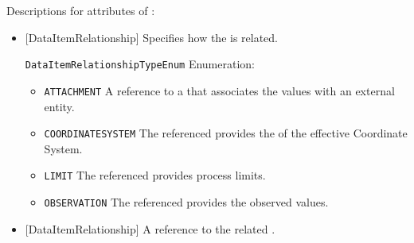 Descriptions for attributes of :

\begin{itemize}

\item {}[DataItemRelationship] \newline Specifies how the  is related.

\texttt{DataItemRelationshipTypeEnum} Enumeration:

\begin{itemize}
\item \texttt{ATTACHMENT} \newline A reference to a  that associates the values with an external entity.
 
\item \texttt{COORDINATE\textunderscore SYSTEM} \newline  The referenced  provides the  of the effective Coordinate System.
 
\item \texttt{LIMIT} \newline The referenced  provides process limits.
 
\item \texttt{OBSERVATION} \newline The referenced  provides the observed values.
 
\end{itemize}


\item {}[DataItemRelationship] \newline A reference to the related  .

\end{itemize}


